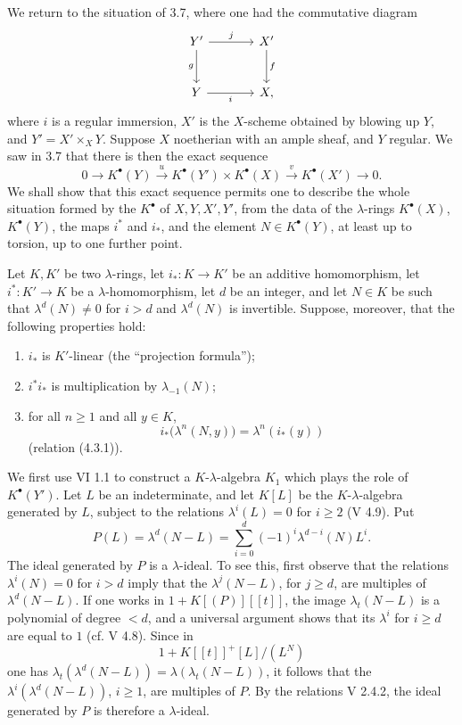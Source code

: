 We return to the situation of 3.7, where one had the commutative diagram
\[
\begin{tikzcd}[column sep=large,row sep=large]
Y' \arrow[r,"j"] \arrow[d,"g"'] & X' \arrow[d,"f"]\\
Y \arrow[r,"i"'] & X,
\end{tikzcd}
\]
where \(i\) is a regular immersion, \(X'\) is the \(X\)-scheme obtained by blowing up \(Y\), and \(Y'=X'\times_XY\). Suppose \(X\) noetherian with an ample sheaf, and \(Y\) regular. We saw in 3.7 that there is then the exact sequence
\[
0\longrightarrow K^\bullet(Y)\xrightarrow{u}
K^\bullet(Y')\times K^\bullet(X)\xrightarrow{v}
K^\bullet(X')\longrightarrow0.
\]
We shall show that this exact sequence permits one to describe the whole situation formed by the \(K^\bullet\) of \(X,Y,X',Y'\), from the data of the \(\lambda\)-rings \(K^\bullet(X)\), \(K^\bullet(Y)\), the maps \(i^*\) and \(i_*\), and the element \(N\in K^\bullet(Y)\), at least up to torsion, up to one further point.

Let \(K,K'\) be two \(\lambda\)-rings, let \(i_*:K\to K'\) be an additive homomorphism, let \(i^*:K'\to K\) be a \(\lambda\)-homomorphism, let \(d\) be an integer, and let \(N\in K\) be such that \(\lambda^d(N)\ne0\) for \(i>d\) and \(\lambda^d(N)\) is invertible. Suppose, moreover, that the following properties hold:
\begin{enumerate}[label=\roman*)]
\item \(i_*\) is \(K'\)-linear (the ``projection formula'');
\item \(i^*i_*\) is multiplication by \(\lambda_{-1}(N)\);
\item for all \(n\ge1\) and all \(y\in K\),
\[
 i_*\bigl(\lambda^n(N,y)\bigr)=\lambda^n(i_*(y))
\]
(relation (4.3.1)).
\end{enumerate}

We first use VI 1.1 to construct a \(K\)-\(\lambda\)-algebra \(K_1\) which plays the role of \(K^\bullet(Y')\). Let \(L\) be an indeterminate, and let \(K[L]\) be the \(K\)-\(\lambda\)-algebra generated by \(L\), subject to the relations \(\lambda^i(L)=0\) for \(i\ge2\) (V 4.9). Put
\[
  P(L)=\lambda^d(N-L)=\sum_{i=0}^{d}(-1)^i\lambda^{d-i}(N)L^i.
\]
The ideal generated by \(P\) is a \(\lambda\)-ideal. To see this, first observe that the relations \(\lambda^i(N)=0\) for \(i>d\) imply that the \(\lambda^j(N-L)\), for \(j\ge d\), are multiples of \(\lambda^d(N-L)\). If one works in \(1+K[(P)][[t]]\), the image \(\lambda_t(N-L)\) is a polynomial of degree \(<d\), and a universal argument shows that its \(\lambda^i\) for \(i\ge d\) are equal to \(1\) (cf. V 4.8). Since in
\[
1+K[[t]]^+[L]/(L^N)
\]
one has \(\lambda_t(\lambda^d(N-L))=\lambda(\lambda_t(N-L))\), it follows that the \(\lambda^i(\lambda^d(N-L))\), \(i\ge1\), are multiples of \(P\). By the relations V 2.4.2, the ideal generated by \(P\) is therefore a \(\lambda\)-ideal.

